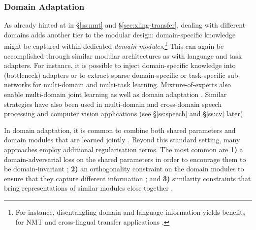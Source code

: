 
\subsubsection{Domain Adaptation}
\label{sec:domain_adap}
As already hinted at in \S\ref{ss:nmt} and \S\ref{sec:xling-transfer}, dealing with different domains adds another tier to the modular design: domain-specific knowledge might be captured within dedicated \textit{domain modules}.\footnote{For instance, disentangling domain and language information yields benefits for NMT and cross-lingual transfer applications \citep{vilar-2018-learning,cooper-stickland-etal-2021-multilingual,pham-etal-2021-revisiting,Saunders:2022survey}.} This can again be accomplished through similar modular architectures as with language and task adapters. For instance, it is possible to inject domain-specific knowledge into (bottleneck) adapters \citep{Zhang:2021ws,Chronopoulou2022EfficientHierarchical} or to extract sparse domain-specific or task-specific sub-networks \citep{Thompson:2018nmt,ke-etal-2021-adapting} for multi-domain and multi-task learning. Mixture-of-experts also enable multi-domain joint learning as well as domain adaptation \citep{Guo:2018emnlp,Zhang:2022metadmoe}. Similar strategies have also been used in multi-domain and cross-domain speech processing and computer vision applications (see \S\ref{ss:speech} and \S\ref{ss:cv} later).

In domain adaptation, it is common to combine both shared parameters and domain modules that are learned jointly \citep{Bousmalis2016}. Beyond this standard setting, many approaches employ additional regularisation terms. The most common are \textbf{1)} a domain-adversarial loss on the shared parameters in order to encourage them to be domain-invariant \citep{ganin2016domain,chen-cardie-2018-multinomial}; \textbf{2)} an orthogonality constraint on the domain modules to ensure that they capture different information \citep{baktashmotlagh2013unsupervised,kim-etal-2017-adversarial}; and \textbf{3)} similarity constraints that bring representations of similar modules close together \citep{Bousmalis2016}.


